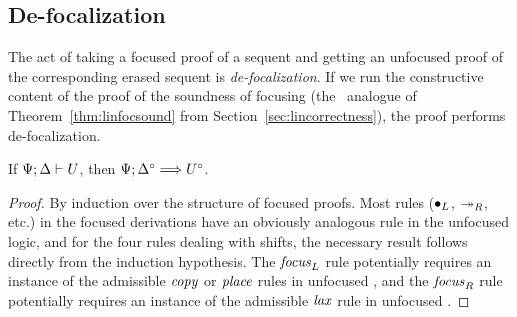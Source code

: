 \subsection{De-focalization}

The act of taking a focused proof of a sequent and getting an unfocused
proof of the corresponding erased sequent is {\it de-focalization}.
If we run the constructive content of 
the proof of the soundness of focusing (the \ollll~analogue of
Theorem~\ref{thm:linfocsound} from Section~\ref{sec:lincorrectness}),
the proof performs de-focalization.

\bigskip
\begin{theorem}
If ${\Psi};{\Delta} \vdash {U}$, then $\Psi; \Delta^\circ \Longrightarrow U^\circ$.
\end{theorem}

\begin{proof}
  By induction over the structure of focused proofs. 
  Most rules (${\mathbin{\bullet}}_L$, $\twoheadrightarrow_R$, etc.) in the
  focused derivations have an obviously analogous rule in the unfocused
  logic, and for the four rules dealing with shifts,
  the necessary result follows directly from the induction hypothesis. 
  The ${\it focus}_L$ rule potentially requires an instance of the
  admissible ${\it copy}$ or ${\it place}$ rules in unfocused \ollll, and
  the ${\it focus}_R$ rule potentially requires an instance of the
  admissible ${\it lax}$ rule in unfocused \ollll.
\end{proof}

